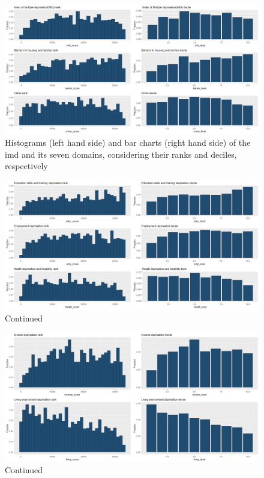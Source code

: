 \documentclass[12pt]{article}
\begin{document}
\begin{figure}[H]
    \includegraphics[width=18cm]{Rplot3.png}
    \caption{Histograms (left hand side) and bar charts (right hand side) of the \acrshort{imd} and its seven domains, considering their ranks and deciles, respectively}
    \label{fig:IMD1}
\end{figure}

\begin{figure}[H]
    \includegraphics[width=18cm]{Rplot4.png}
    \caption{Continued}
    \label{fig:IMD2}
\end{figure}

\begin{figure}[H]
    \includegraphics[width=18cm]{Rplot5.png}
    \caption{Continued}
    \label{fig:IMD3}
\end{figure}
\end{document}
